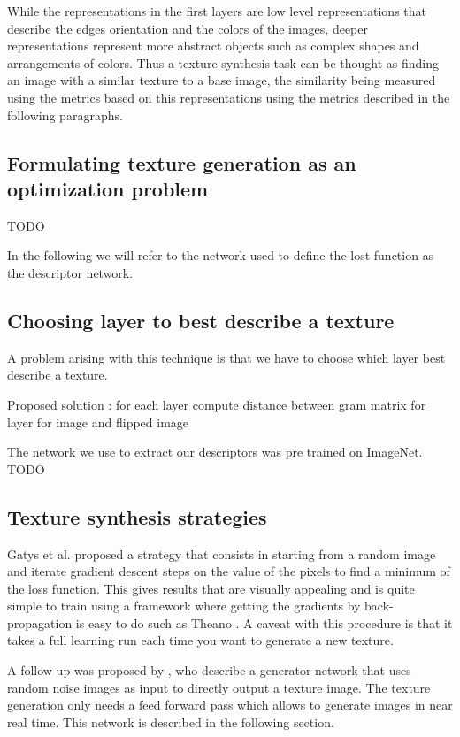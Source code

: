\documentclass{article}
\begin{document}
While the representations in the first layers are low level representations that describe the edges orientation and the colors of the images, deeper representations represent more abstract objects such as complex shapes and arrangements of colors. Thus a texture synthesis task can be thought as finding an image with a similar texture to a base image, the similarity being measured using the metrics based on this representations using the metrics described in the following paragraphs.

\subsection{Formulating texture generation as an optimization problem}

TODO

In the following we will refer to the network used to define the lost function as the descriptor network.

\subsection{Choosing layer to best describe a texture}

A problem arising with this technique is that we have to choose which layer best describe a texture.

Proposed solution : for each layer compute distance between gram matrix for layer for image and flipped image

The network we use to extract our descriptors was pre trained on ImageNet. TODO

\subsection{Texture synthesis strategies}

Gatys et al. proposed a strategy that consists in starting from a random image and iterate gradient descent steps on the value of the pixels to find a minimum of the loss function. This gives results that are visually appealing and is quite simple to train using a framework where getting the gradients by back-propagation is easy to do such as Theano \cite{bastien2012theano}. A caveat with this procedure is that it takes a full learning run each time you want to generate a new texture.

A follow-up was proposed by  \citeauthor{2016arXiv160303417U}, who describe a generator network that uses random noise images as input to directly output a texture image. The texture generation only needs a feed forward pass which allows to generate images in near real time. This network is described in the following section.
\end{document}
